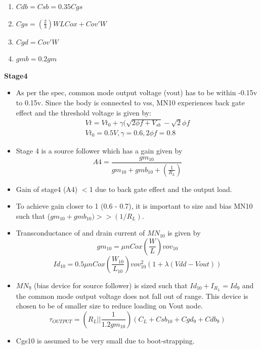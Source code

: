 \documentclass[12pt,a4paper]{article}
\begin{document}
\begin{enumerate}
\item $Cdb=Csb=0.35 Cgs$
\item $Cgs=(\frac{2}{3})WLCox+Cov'W$
\item $Cgd=Cov'W$
\item $gmb=0.2gm$
\setcounter{numberedCntBB}{\theenumi}
\end{enumerate}


\textbf{Stage4}

\begin{itemize}
	\item As per the spec, common mode output voltage (vout) has to be within -0.15v to 0.15v. Since the body is connected to vss, MN10 experiences back gate effect and the threshold voltage is given by:
	\begin{equation}
	\begin{split}
		Vt=Vt_0+ \gamma(\sqrt{2\phi f+V_{sb}}- \sqrt{2}\phi f\\
		Vt_0=0.5V , \gamma=0.6 , 2\phi f=0.8
	\end{split}
	\end{equation}


	\item Stage 4 is a source follower which has a gain given by
	\begin{equation}
		A4=\frac{gm_{10}}{gm_{10}+gmb_{10}+(\frac{1}{R_L})}
	\end{equation}
	\item Gain of stage4 (A4) $<$1 due to back gate effect and the output load. 
	\item To achieve gain closer to 1 (0.6 - 0.7), it is important to size and bias MN10 such that ($gm_{10}+ gmb_{10}) >> (1/R_L)$. 
	\item Transconductance of and drain current of $MN_{10}$ is given by 
	\begin{equation}
		gm_{10}= \mu nCox(\frac{W}{L})vov_{10}
	\end{equation}
	\begin{equation}
		Id_{10}=0.5\mu nCox(\frac{W_{10}}{L_{10}})vov_{10}^2 (1+\lambda (Vdd-Vout))
	\end{equation}
	\item $MN_9$ (bias device for source follower) is sized such that $Id_{10}+ I_{R_L}= Id_9$ and the common mode output voltage does not fall out of range. This device is chosen to be of smaller size to reduce loading on Vout node. 
	\begin{equation}
		\tau_{OUTPUT} = (R_L || \frac{1}{1.2gm_{10}})(C_L+Csb_{10}+Cgd_9+Cdb_9)
	\end{equation}
	\item Cgs10 is assumed to be very small due to boot-strapping.
\end{itemize}
\end{document}
